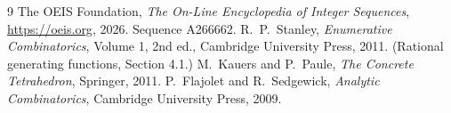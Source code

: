 \documentclass[11pt,a4paper]{article}
\theoremstyle{plain}
\theoremstyle{definition}
\begin{document}
\begin{thebibliography}{9}
 The OEIS Foundation, \emph{The On-Line Encyclopedia of Integer
Sequences}, \url{https://oeis.org}, 2026. Sequence A266662.
 R.~P.~Stanley, \emph{Enumerative Combinatorics}, Volume 1, 2nd ed.,
Cambridge University Press, 2011. (Rational generating functions, Section 4.1.)
 M.~Kauers and P.~Paule, \emph{The Concrete Tetrahedron}, Springer, 2011.
 P.~Flajolet and R.~Sedgewick, \emph{Analytic Combinatorics}, Cambridge
University Press, 2009.
\end{thebibliography}
\end{document}
